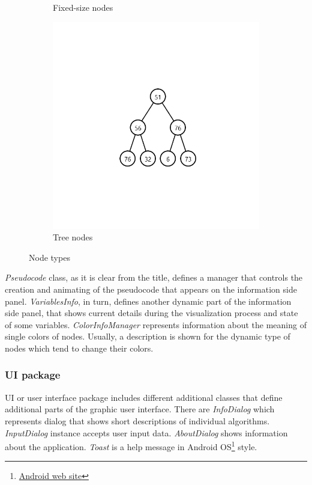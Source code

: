 \documentclass[
  field=inf,
  biblatex,
  language=english,
  glossaries,
  theorems=false,
  sourcecodes=false,
  index
]{kidiplom}
\begin{document}
\begin{figure}[H]
\begin{subfigure}{0.31\textwidth}
		\caption{Fixed-size nodes} \label{fig:1b}
	\end{subfigure}
	\hspace*{\fill} %
	\begin{subfigure}{0.31\textwidth}
		\includegraphics[width=\linewidth]{img/tree.png}
		\caption{Tree nodes} \label{fig:1c}
	\end{subfigure}
	\caption{Node types} \label{fig:1}
\end{figure}

\textit{Pseudocode} class, as it is clear from the title, defines a manager that controls the creation and animating of the pseudocode that appears on the information side panel. \textit{VariablesInfo}, in turn, defines another dynamic part of the information side panel, that shows current details during the visualization process and state of some variables. \textit{ColorInfoManager} represents information about the meaning of single colors of nodes. Usually, a description is shown for the dynamic type of nodes which tend to change their colors.

\subsubsection{UI package}
UI or user interface package includes different additional classes that define additional parts of the graphic user interface. There are \textit{InfoDialog} which represents dialog that shows short descriptions of individual algorithms. \textit{InputDialog} instance accepts user input data. \textit{AboutDialog} shows information about the application. \textit{Toast} is a help message in Android OS\footnote{\href{https://www.android.com/}{Android web site}} style.
\end{document}
